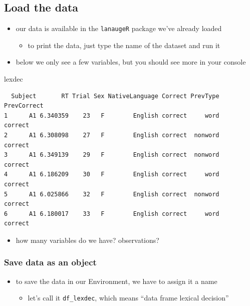 \documentclass[
  letterpaper,
  DIV=11]{scrartcl}
\newenvironment{Shaded}{\begin{snugshade}}{\end{snugshade}}
\newcommand{\NormalTok}[1]{\textcolor[rgb]{0.00,0.23,0.31}{#1}}
\providecommand{\tightlist}{%
  \setlength{\itemsep}{0pt}\setlength{\parskip}{0pt}}\usepackage{longtable,booktabs,array}
\theoremstyle{definition}
\theoremstyle{remark}
\begin{document}
\hypertarget{load-the-data}{%
\subsection{Load the data}\label{load-the-data}}

\begin{itemize}
\tightlist
\item
  our data is available in the \texttt{lanaugeR} package we've already
  loaded

  \begin{itemize}
  \tightlist
  \item
    to print the data, just type the name of the dataset and run it
  \end{itemize}
\item
  below we only see a few variables, but you should see more in your
  console
\end{itemize}

\begin{Shaded}
\begin{Highlighting}[]
\NormalTok{lexdec}
\end{Highlighting}
\end{Shaded}

\begin{verbatim}
  Subject       RT Trial Sex NativeLanguage Correct PrevType PrevCorrect
1      A1 6.340359    23   F        English correct     word     correct
2      A1 6.308098    27   F        English correct  nonword     correct
3      A1 6.349139    29   F        English correct  nonword     correct
4      A1 6.186209    30   F        English correct     word     correct
5      A1 6.025866    32   F        English correct  nonword     correct
6      A1 6.180017    33   F        English correct     word     correct
\end{verbatim}

\begin{itemize}
\tightlist
\item
  how many variables do we have? observations?
\end{itemize}

\hypertarget{save-data-as-an-object}{%
\subsubsection{Save data as an object}\label{save-data-as-an-object}}

\begin{itemize}
\tightlist
\item
  to save the data in our Environment, we have to assign it a name

  \begin{itemize}
  \tightlist
  \item
    let's call it \texttt{df\_lexdec}, which means ``data frame lexical
    decision''
  \end{itemize}
\end{itemize}
\end{document}
